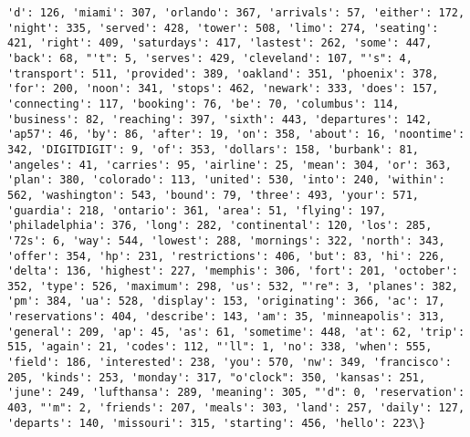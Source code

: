 \documentclass[11pt]{article}
\begin{document}
\begin{Verbatim}[commandchars=\\\{\}]
'd': 126, 'miami': 307, 'orlando': 367, 'arrivals': 57, 'either': 172, 'night': 335, 'served': 428, 'tower': 508, 'limo': 274, 'seating': 421, 'right': 409, 'saturdays': 417, 'lastest': 262, 'some': 447, 'back': 68, "'t": 5, 'serves': 429, 'cleveland': 107, "'s": 4, 'transport': 511, 'provided': 389, 'oakland': 351, 'phoenix': 378, 'for': 200, 'noon': 341, 'stops': 462, 'newark': 333, 'does': 157, 'connecting': 117, 'booking': 76, 'be': 70, 'columbus': 114, 'business': 82, 'reaching': 397, 'sixth': 443, 'departures': 142, 'ap57': 46, 'by': 86, 'after': 19, 'on': 358, 'about': 16, 'noontime': 342, 'DIGITDIGIT': 9, 'of': 353, 'dollars': 158, 'burbank': 81, 'angeles': 41, 'carries': 95, 'airline': 25, 'mean': 304, 'or': 363, 'plan': 380, 'colorado': 113, 'united': 530, 'into': 240, 'within': 562, 'washington': 543, 'bound': 79, 'three': 493, 'your': 571, 'guardia': 218, 'ontario': 361, 'area': 51, 'flying': 197, 'philadelphia': 376, 'long': 282, 'continental': 120, 'los': 285, '72s': 6, 'way': 544, 'lowest': 288, 'mornings': 322, 'north': 343, 'offer': 354, 'hp': 231, 'restrictions': 406, 'but': 83, 'hi': 226, 'delta': 136, 'highest': 227, 'memphis': 306, 'fort': 201, 'october': 352, 'type': 526, 'maximum': 298, 'us': 532, "'re": 3, 'planes': 382, 'pm': 384, 'ua': 528, 'display': 153, 'originating': 366, 'ac': 17, 'reservations': 404, 'describe': 143, 'am': 35, 'minneapolis': 313, 'general': 209, 'ap': 45, 'as': 61, 'sometime': 448, 'at': 62, 'trip': 515, 'again': 21, 'codes': 112, "'ll": 1, 'no': 338, 'when': 555, 'field': 186, 'interested': 238, 'you': 570, 'nw': 349, 'francisco': 205, 'kinds': 253, 'monday': 317, "o'clock": 350, 'kansas': 251, 'june': 249, 'lufthansa': 289, 'meaning': 305, "'d": 0, 'reservation': 403, "'m": 2, 'friends': 207, 'meals': 303, 'land': 257, 'daily': 127, 'departs': 140, 'missouri': 315, 'starting': 456, 'hello': 223\}

\end{Verbatim}
\end{document}

